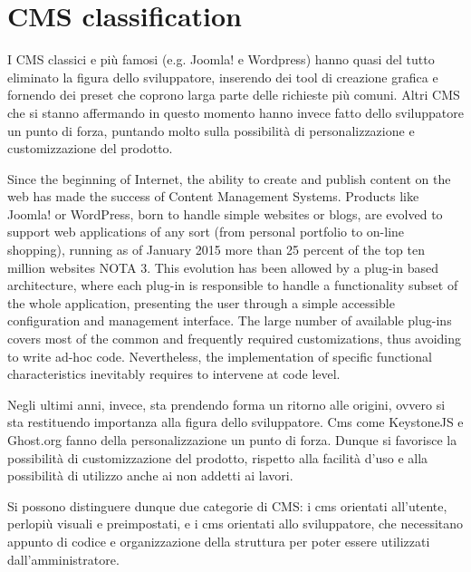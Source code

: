 \section{CMS classification}
\label{sec:CMS_class}

I CMS classici e più famosi (e.g. Joomla! e Wordpress) hanno quasi del tutto eliminato la figura dello sviluppatore, inserendo dei tool di creazione grafica e fornendo dei preset che coprono larga parte delle richieste più comuni. Altri CMS che si stanno affermando in questo momento hanno invece fatto dello sviluppatore un punto di forza, puntando molto sulla possibilità di personalizzazione e customizzazione del prodotto.

Since the beginning of Internet, the ability to create and publish content on the web has made the success of Content Management Systems. Products like Joomla! or WordPress, born to handle simple websites or blogs, are evolved to support web applications of any sort (from personal portfolio to on-line shopping), running as of January 2015 more than 25 percent of the top ten million websites NOTA 3. This evolution has been allowed by a plug-in based architecture, where each plug-in is responsible to handle a functionality subset of the whole application, presenting the user through a simple accessible configuration and management interface.
The large number of available plug-ins covers most of the common and frequently required customizations, thus avoiding to write ad-hoc code. Nevertheless, the implementation of specific functional characteristics inevitably requires to intervene at code level.

Negli ultimi anni, invece, sta prendendo forma un ritorno alle origini, ovvero si sta restituendo importanza alla figura dello sviluppatore. Cms come KeystoneJS e Ghost.org fanno della personalizzazione un punto di forza.
Dunque si favorisce la possibilità di customizzazione del prodotto, rispetto alla facilità d'uso e alla possibilità di utilizzo anche ai non addetti ai lavori. 

Si possono distinguere dunque due categorie di CMS: i cms orientati all'utente, perlopiù visuali e preimpostati, e i cms orientati allo sviluppatore, che necessitano appunto di codice e organizzazione della struttura per poter essere utilizzati dall'amministratore.
